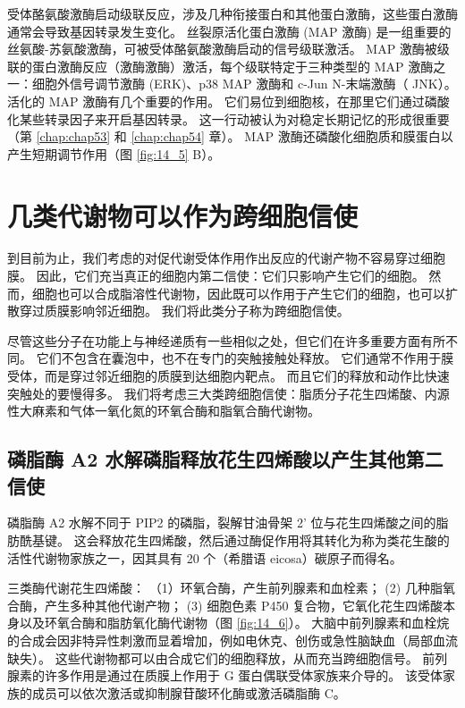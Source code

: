 受体酪氨酸激酶启动级联反应，涉及几种衔接蛋白和其他蛋白激酶，这些蛋白激酶通常会导致基因转录发生变化。 丝裂原活化蛋白激酶 (MAP 激酶) 是一组重要的丝氨酸-苏氨酸激酶，可被受体酪氨酸激酶启动的信号级联激活。
MAP 激酶被级联的蛋白激酶反应（激酶激酶）激活，每个级联特定于三种类型的 MAP 激酶之一：细胞外信号调节激酶 (ERK)、p38 MAP 激酶和 c-Jun N-末端激酶（ JNK）。
活化的 MAP 激酶有几个重要的作用。
它们易位到细胞核，在那里它们通过磷酸化某些转录因子来开启基因转录。
这一行动被认为对稳定长期记忆的形成很重要（第 \ref{chap:chap53} 和 \ref{chap:chap54} 章）。 
MAP 激酶还磷酸化细胞质和膜蛋白以产生短期调节作用（图 \ref{fig:14_5} B）。


\section{几类代谢物可以作为跨细胞信使}

到目前为止，我们考虑的对促代谢受体作用作出反应的代谢产物不容易穿过细胞膜。 
因此，它们充当真正的细胞内第二信使：它们只影响产生它们的细胞。
然而，细胞也可以合成脂溶性代谢物，因此既可以作用于产生它们的细胞，也可以扩散穿过质膜影响邻近细胞。 
我们将此类分子称为跨细胞信使。


尽管这些分子在功能上与神经递质有一些相似之处，但它们在许多重要方面有所不同。
它们不包含在囊泡中，也不在专门的突触接触处释放。 
它们通常不作用于膜受体，而是穿过邻近细胞的质膜到达细胞内靶点。
而且它们的释放和动作比快速突触处的要慢得多。
我们将考虑三大类跨细胞信使：脂质分子花生四烯酸、内源性大麻素和气体一氧化氮的环氧合酶和脂氧合酶代谢物。


\subsection{磷脂酶 A2 水解磷脂释放花生四烯酸以产生其他第二信使}

磷脂酶 A2 水解不同于 PIP2 的磷脂，裂解甘油骨架 2' 位与花生四烯酸之间的脂肪酰基键。
这会释放花生四烯酸，然后通过酶促作用将其转化为称为类花生酸的活性代谢物家族之一，因其具有 20 个（希腊语 eicosa）碳原子而得名。


三类酶代谢花生四烯酸：
（1）环氧合酶，产生前列腺素和血栓素； 
(2) 几种脂氧合酶，产生多种其他代谢产物； 
(3) 细胞色素 P450 复合物，它氧化花生四烯酸本身以及环氧合酶和脂肪氧化酶代谢物（图 \ref{fig:14_6}）。 
大脑中前列腺素和血栓烷的合成会因非特异性刺激而显着增加，例如电休克、创伤或急性脑缺血（局部血流缺失）。
这些代谢物都可以由合成它们的细胞释放，从而充当跨细胞信号。
前列腺素的许多作用是通过在质膜上作用于 G 蛋白偶联受体家族来介导的。
该受体家族的成员可以依次激活或抑制腺苷酸环化酶或激活磷脂酶 C。

